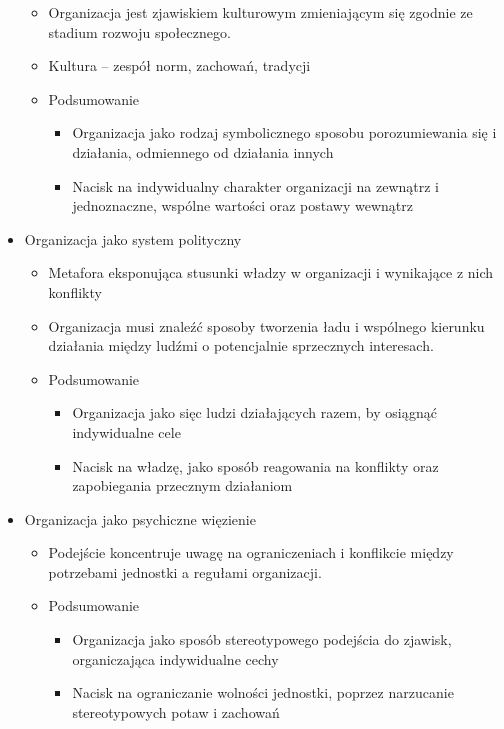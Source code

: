 \documentclass[a4paper,10pt]{report}
\begin{document}
\begin{itemize}
	\begin{itemize}
		\item Organizacja jest zjawiskiem kulturowym zmieniającym się zgodnie ze stadium rozwoju społecznego.
		\item Kultura -- zespół norm, zachowań, tradycji
		\item Podsumowanie
		\begin{itemize}
			\item Organizacja jako rodzaj symbolicznego sposobu porozumiewania się i działania, odmiennego od działania innych
			\item Nacisk na indywidualny charakter organizacji na zewnątrz i jednoznaczne, wspólne wartości oraz postawy wewnątrz
		\end{itemize}
	\end{itemize}
	\item Organizacja jako system polityczny
	\begin{itemize}
		\item Metafora eksponująca stusunki władzy w organizacji i wynikające z nich konflikty
		\item Organizacja musi znaleźć sposoby tworzenia ładu i wspólnego kierunku działania między ludźmi o potencjalnie sprzecznych interesach.
		\item Podsumowanie
		\begin{itemize}
			\item Organizacja jako sięc ludzi działających razem, by osiągnąć indywidualne cele
			\item Nacisk na władzę, jako sposób reagowania na konflikty oraz zapobiegania przecznym działaniom
		\end{itemize}
	\end{itemize}
	\item Organizacja jako psychiczne więzienie
	\begin{itemize}
		\item Podejście koncentruje uwagę na ograniczeniach i konflikcie między potrzebami jednostki a regułami organizacji.		
		\item Podsumowanie
		\begin{itemize}
			\item Organizacja jako sposób stereotypowego podejścia do zjawisk, organiczająca indywidualne cechy
			\item Nacisk na ograniczanie wolności jednostki, poprzez narzucanie stereotypowych potaw i zachowań
		\end{itemize}
	\end{itemize}

\end{itemize}
\end{document}
